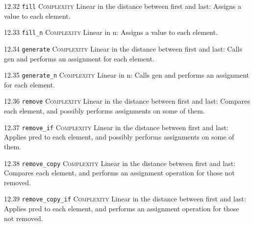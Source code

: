 \noindent\textcolor{corange}{12.32 \texttt{fill}} \textsc{Complexity} Linear in the distance between first and last: Assigns a value to each element. \vspace{0.5em}

\noindent\textcolor{corange}{12.33 \texttt{fill\_n}} \textsc{Complexity} Linear in n: Assigns a value to each element. \vspace{0.5em}

\noindent\textcolor{corange}{12.34 \texttt{generate}} \textsc{Complexity} Linear in the distance between first and last: Calls gen and performs an assignment for each element. \vspace{0.5em}

\noindent\textcolor{corange}{12.35 \texttt{generate\_n}} \textsc{Complexity} Linear in n: Calls gen and performs an assignment for each element. \vspace{0.5em}

\noindent\textcolor{corange}{12.36 \texttt{remove}} \textsc{Complexity} Linear in the distance between first and last: Compares each element, and possibly performs assignments on some of them. \vspace{0.5em}

\noindent\textcolor{corange}{12.37 \texttt{remove\_if}} \textsc{Complexity} Linear in the distance between first and last: Applies pred to each element, and possibly performs assignments on some of them. \vspace{0.5em}

\noindent\textcolor{corange}{12.38 \texttt{remove\_copy}} \textsc{Complexity} Linear in the distance between first and last: Compares each element, and performs an assignment operation for those not removed. \vspace{0.5em}

\noindent\textcolor{corange}{12.39 \texttt{remove\_copy\_if}} \textsc{Complexity} Linear in the distance between first and last: Applies pred to each element, and performs an assignment operation for those not removed. \vspace{0.5em}

